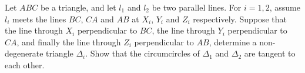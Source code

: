 Let $ABC$ be a triangle, and let $l_1$ and $l_2$ be two parallel lines.
For $i=1, 2$, assume $l_i$ meets the lines $BC$, $CA$ and $AB$ at $X_i$, $Y_i$ and $Z_i$ respectively.
Suppose that the line through $X_i$ perpendicular to $BC$, the line through $Y_i$ perpendicular to $CA$,
and finally the line through $Z_i$ perpendicular to $AB$, determine a non-degenerate triangle $\Delta_i$.
Show that the circumcircles of $\Delta_1$ and $\Delta_2$ are tangent to each other.
